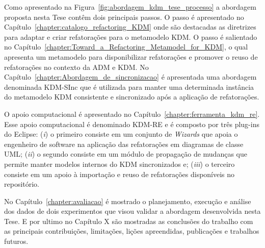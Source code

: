 Como apresentado na Figura~\ref{fig:abordagem_kdm_tese_processo} a abordagem proposta nesta Tese contêm dois principais passos. O passo  é apresentado no Capítulo~\ref{chapter:catalogo_refactoring_KDM} onde são destacadas as diretrizes para adaptar e criar refatorações para o metamodelo KDM. O passo  é salientado no Capítulo~\ref{chapter:Toward_a_Refactoring_Metamodel_for_KDM}, o qual apresenta um metamodelo para disponibilizar refatorações e promover o reuso de refatorações no contexto da ADM e KDM. No Capítulo~\ref{chapter:Abordagem_de_sincronizacao} é apresentada uma abordagem denominada KDM-SInc que é utilizada para manter uma determinada instância do metamodelo KDM consistente e sincronizado após a aplicação de refatorações. 

O apoio computacional  é apresentado no Capítulo~\ref{chapter:ferramenta_kdm_re}. Esse apoio computacional é denominado KDM-RE e é composto por três plug-ins do Eclipse: (\textit{i}) o primeiro consiste em um conjunto de \textit{Wizards} que apoia o engenheiro de software na aplicação das refatorações em diagramas de classe UML; (\textit{ii}) o segundo consiste em um módulo de propagação de mudanças que permite manter modelos internos do KDM sincronizados e; (\textit{iii}) o terceiro consiste em um apoio à importação e reuso de refatorações disponíveis no repositório.


No Capítulo~\ref{chapter:avaliacao} é mostrado o planejamento, execução e análise dos dados de dois experimentos que visou validar a abordagem desenvolvida nesta Tese.  E por ultimo no Capítulo X são mostradas as conclusões do trabalho com as principais contribuições, limitações, lições apreendidas, publicações e trabalhos futuros.


